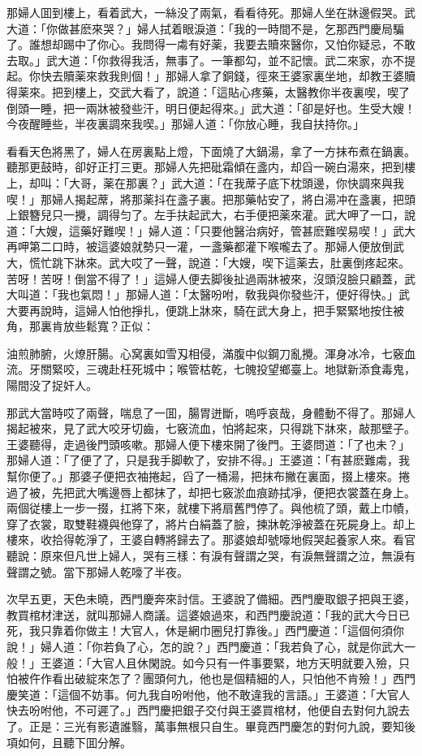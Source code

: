 那婦人囬到樓上，看着武大，一絲没了兩氣，看看待死。那婦人坐在牀邊假哭。武大道：「你做甚麽來哭？」婦人拭着眼淚道：「我的一時間不是，乞那西門慶局騙了。誰想却踢中了你心。我問得一䖏有好薬，我要去贖來醫你，又怕你疑忌，不敢去取。」武大道：「你救得我活，無事了。一筆都勾，並不記懷。武二來家，亦不提起。你快去贖薬來救我則個！」那婦人拿了銅錢，徑來王婆家裏坐地，却教王婆贖得薬來。把到樓上，交武大看了，說道：「這貼心疼藥，太醫教你半夜裏喫，喫了倒頭一睡，把一兩牀被發些汗，明日便起得來。」武大道：「卻是好也。生受大嫂！今夜醒睡些，半夜裏調來我喫。」那婦人道：「你放心睡，我自扶持你。」

看看天色將黑了，婦人在房裏點上燈，下面燒了大鍋湯，拿了一方抹布煮在鍋裏。聽那更鼓時，卻好正打三更。那婦人先把砒霜傾在盞内，却舀一碗白湯來，把到樓上，却叫：「大哥，薬在那裏？」武大道：「在我蓆子底下枕頭邊，你快調來與我喫！」那婦人揭起蓆，將那薬抖在盞子裏。把那藥帖安了，將白湯冲在盞裏，把頭上銀簪兒只一攪，調得匀了。左手扶起武大，右手便把薬來灌。武大呷了一口，說道：「大嫂，這藥好難喫！」婦人道：「只要他醫治病好，管甚麽難喫易喫！」武大再呷第二口時，被這婆娘就勢只一灌，一盞藥都灌下喉嚨去了。那婦人便放倒武大，慌忙跳下牀來。武大哎了一聲，說道：「大嫂，喫下這薬去，肚裏倒疼起來。苦呀！苦呀！倒當不得了！」這婦人便去脚後扯過兩牀被來，沒頭沒臉只顧蓋，武大叫道：「我也氣悶！」那婦人道：「太醫吩咐，敎我與你發些汗，便好得快。」武大要再說時，這婦人怕他掙扎，便跳上牀來，騎在武大身上，把手緊緊地按住被角，那裏肯放些鬆寬？正似：

油煎肺腑，火燎肝腸。心窝裏如雪刄相侵，滿腹中似鋼刀亂攪。渾身冰冷，七竅血流。牙關緊咬，三魂赴枉死城中；喉管枯乾，七魄投望鄉臺上。地獄新添食毒鬼，陽間没了捉奸人。

那武大當時哎了兩聲，喘息了一囬，腸胃迸斷，嗚呼哀哉，身體動不得了。那婦人揭起被來，見了武大咬牙切齒，七竅流血，怕將起來，只得跳下牀來，敲那壁子。王婆聽得，走過後門頭咳嗽。那婦人便下樓來開了後門。王婆問道：「了也未？」那婦人道：「了便了了，只是我手脚軟了，安排不得。」王婆道：「有甚麽難䖏，我幫你便了。」那婆子便把衣袖捲起，舀了一桶湯，把抹布撇在裏面，掇上樓來。捲過了被，先把武大嘴邊唇上都抹了，却把七竅淤血痕跡拭凈，便把衣裳蓋在身上。兩個従樓上一步一掇，扛將下來，就樓下將扇舊門停了。與他梳了頭，戴上巾幘，穿了衣裳，取雙鞋襪與他穿了，將片白絹蓋了臉，揀牀乾淨被蓋在死屍身上。却上樓來，收拾得乾淨了，王婆自轉將歸去了。那婆娘却號嚎地假哭起養家人來。看官聽說：原來但凡世上婦人，哭有三樣：有淚有聲謂之哭，有淚無聲謂之泣，無淚有聲謂之號。當下那婦人乾嚎了半夜。

次早五更，天色未曉，西門慶奔來討信。王婆說了備細。西門慶取銀子把與王婆，教買棺材津送，就叫那婦人商議。這婆娘過來，和西門慶說道：「我的武大今日已死，我只靠着你做主！大官人，休是網巾圈兒打靠後。」西門慶道：「這個何須你說！」婦人道：「你若負了心，怎的說？」西門慶道：「我若負了心，就是你武大一般！」王婆道：「大官人且休閑說。如今只有一件事要緊，地方天明就要入殮，只怕被仵作看出破綻來怎了？團頭何九，他也是個精細的人，只怕他不肯殮！」西門慶笑道：「這個不妨事。何九我自吩咐他，他不敢違我的言語。」王婆道：「大官人快去吩咐他，不可遲了。」西門慶把銀子交付與王婆買棺材，他便自去對何九說去了。正是：三光有影遺誰翳，萬事無根只自生。畢竟西門慶怎的對何九說，要知後項如何，且聽下囬分解。

